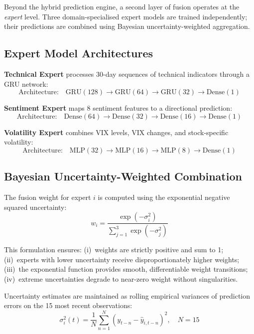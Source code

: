 \documentclass[10pt,a4paper,twoside]{article}
\begin{document}
Beyond the hybrid prediction engine, a second layer of fusion operates at the
\emph{expert} level. Three domain-specialised expert models are trained
independently; their predictions are combined using Bayesian
uncertainty-weighted aggregation.

\subsection{Expert Model Architectures}

\textbf{Technical Expert} processes 30-day sequences of technical indicators
through a GRU network:
\begin{equation}
  \text{Architecture:}\quad \text{GRU}(128) \to \text{GRU}(64) \to \text{GRU}(32) \to \text{Dense}(1)
\end{equation}

\textbf{Sentiment Expert} maps 8 sentiment features to a directional prediction:
\begin{equation}
  \text{Architecture:}\quad \text{Dense}(64) \to \text{Dense}(32) \to \text{Dense}(16) \to \text{Dense}(1)
\end{equation}

\textbf{Volatility Expert} combines VIX levels, VIX changes, and stock-specific
volatility:
\begin{equation}
  \text{Architecture:}\quad \text{MLP}(32) \to \text{MLP}(16) \to \text{MLP}(8) \to \text{Dense}(1)
\end{equation}

\subsection{Bayesian Uncertainty-Weighted Combination}

The fusion weight for expert $i$ is computed using the exponential negative
squared uncertainty:
\begin{equation}
  w_i = \frac{\exp(-\sigma_i^2)}{\sum_{j=1}^{3} \exp(-\sigma_j^2)}
  \label{eq:bayesian}
\end{equation}

This formulation ensures: (i)~weights are strictly positive and sum to 1;
(ii)~experts with lower uncertainty receive disproportionately higher weights;
(iii)~the exponential function provides smooth, differentiable weight transitions;
(iv)~extreme uncertainties degrade to near-zero weight without singularities.

Uncertainty estimates are maintained as rolling empirical variances of
prediction errors on the 15 most recent observations:
\begin{equation}
  \sigma_i^2(t) = \frac{1}{N}\sum_{n=1}^{N}(y_{t-n} - \hat{y}_{i,t-n})^2,
  \quad N = 15
\end{equation}
\end{document}
